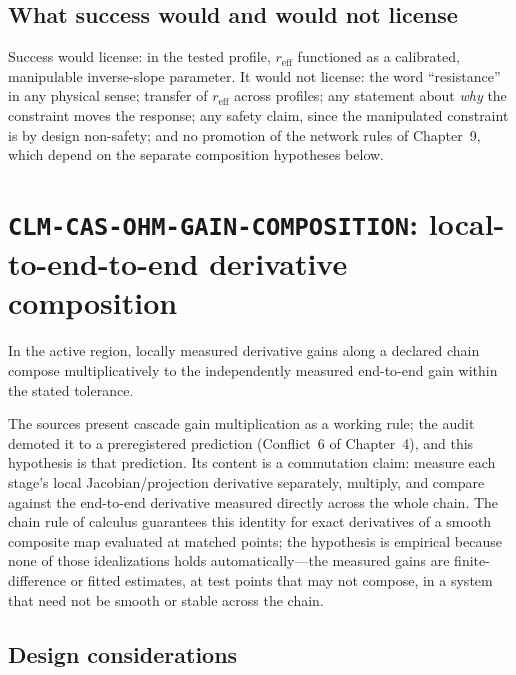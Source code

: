 \subsection{What success would and would not license}

Success would license: in the tested profile, $r_{\mathrm{eff}}$ functioned as a calibrated, manipulable inverse-slope parameter. It would not license: the word ``resistance'' in any physical sense; transfer of $r_{\mathrm{eff}}$ across profiles; any statement about \emph{why} the constraint moves the response; any safety claim, since the manipulated constraint is by design non-safety; and no promotion of the network rules of Chapter~9, which depend on the separate composition hypotheses below.

\section{\texttt{CLM-CAS-OHM-GAIN-COMPOSITION}: local-to-end-to-end derivative composition}\label{hyp:sec:gain}

\begin{hypothesis}\label{hyp:hyp:gain}
In the active region, locally measured derivative gains along a declared chain compose multiplicatively to the independently measured end-to-end gain within the stated tolerance.
\end{hypothesis}

The sources present cascade gain multiplication as a working rule; the audit demoted it to a preregistered prediction (Conflict~6 of Chapter~4), and this hypothesis is that prediction. Its content is a commutation claim: measure each stage's local Jacobian/projection derivative separately, multiply, and compare against the end-to-end derivative measured directly across the whole chain. The chain rule of calculus guarantees this identity for exact derivatives of a smooth composite map evaluated at matched points; the hypothesis is empirical because none of those idealizations holds automatically---the measured gains are finite-difference or fitted estimates, at test points that may not compose, in a system that need not be smooth or stable across the chain.

\subsection{Design considerations}

